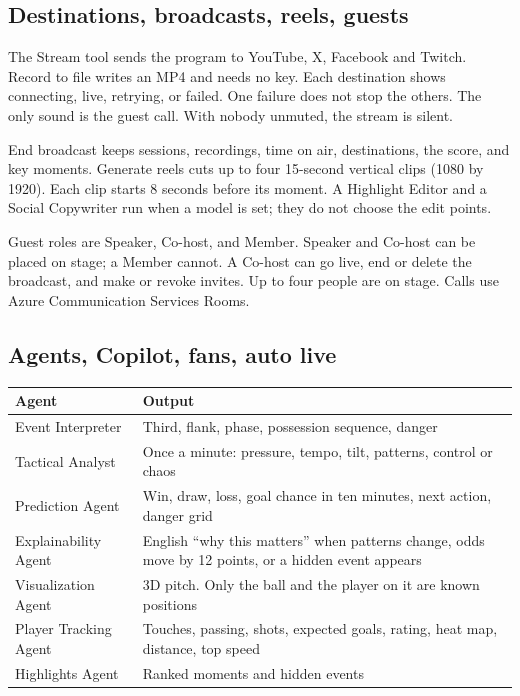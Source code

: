 \documentclass[11pt]{article}
\begin{document}
\subsection{Destinations, broadcasts, reels, guests}

The Stream tool sends the program to YouTube, X, Facebook and Twitch.
Record to file writes an MP4 and needs no key.
Each destination shows connecting, live, retrying, or failed.
One failure does not stop the others.
The only sound is the guest call. With nobody unmuted, the stream is silent.

End broadcast keeps sessions, recordings, time on air, destinations, the score,
and key moments.
Generate reels cuts up to four 15-second vertical clips (1080 by 1920).
Each clip starts 8 seconds before its moment.
A Highlight Editor and a Social Copywriter run when a model is set; they do not
choose the edit points.

Guest roles are Speaker, Co-host, and Member.
Speaker and Co-host can be placed on stage; a Member cannot.
A Co-host can go live, end or delete the broadcast, and make or revoke invites.
Up to four people are on stage.
Calls use Azure Communication Services Rooms.

\subsection{Agents, Copilot, fans, auto live}

\begin{tabularx}{\textwidth}{@{}lX@{}}
\toprule
Agent & Output \\
\midrule
Event Interpreter & Third, flank, phase, possession sequence, danger \\
Tactical Analyst & Once a minute: pressure, tempo, tilt, patterns, control or chaos \\
Prediction Agent & Win, draw, loss, goal chance in ten minutes, next action, danger grid \\
Explainability Agent & English ``why this matters'' when patterns change, odds move by 12 points, or a hidden event appears \\
Visualization Agent & 3D pitch. Only the ball and the player on it are known positions \\
Player Tracking Agent & Touches, passing, shots, expected goals, rating, heat map, distance, top speed \\
Highlights Agent & Ranked moments and hidden events \\
\bottomrule
\end{tabularx}
\end{document}
